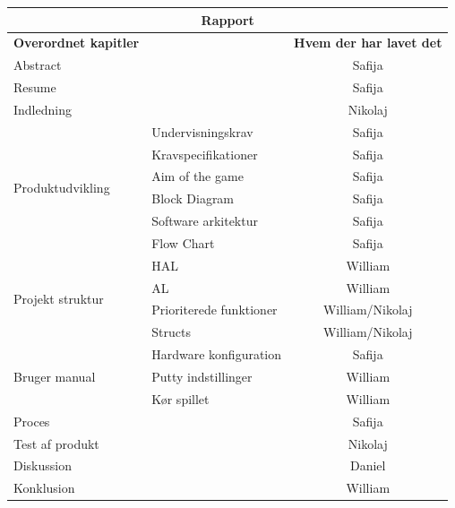 \clearpage
\noindent
\centering
\renewcommand{\arraystretch}{1.5}

\begin{tabular}{|l|l|c|}
\hline
\multicolumn{3}{|c|}{\textbf{\Large Rapport}} \\ \hline
\textbf{Overordnet kapitler} & & \textbf{Hvem der har lavet det} \\ \hline

Abstract &  & Safija \\ \hline
Resume &  & Safija \\ \hline
Indledning &  &  Nikolaj \\ \hline

\multirow{6}{*}{Produktudvikling}
 & Undervisningskrav & Safija \\ \cline{2-3}
 & Kravspecifikationer & Safija \\ \cline{2-3}
 & Aim of the game & Safija \\ \cline{2-3}
 & Block Diagram & Safija \\ \cline{2-3}
 & Software arkitektur & Safija \\ \cline{2-3}
 & Flow Chart & Safija \\ \hline

\multirow{4}{*}{Projekt struktur}
 & HAL & William \\ \cline{2-3}
 & AL & William \\ \cline{2-3}
 & Prioriterede funktioner & William/Nikolaj \\ \cline{2-3}
 & Structs & William/Nikolaj \\ \hline

\multirow{3}{*}{Bruger manual}
 & Hardware konfiguration & Safija \\ \cline{2-3}
 & Putty indstillinger & William \\ \cline{2-3}
 & Kør spillet & William \\ \hline

Proces &  & Safija \\ \hline
Test af produkt &  & Nikolaj \\ \hline
Diskussion &  & Daniel \\ \hline
Konklusion &  & William \\ \hline

\end{tabular}
